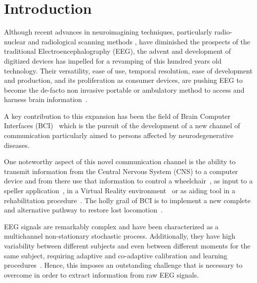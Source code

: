 \documentclass[utf8]{frontiersSCNS} %
\begin{document}
\section{Introduction}


Although recent advances in neuroimagining techniques, particularly radio-nuclear and radiological scanning methods \citep{Schomer2010}, have diminished the prospects of the traditional Electroencephalography (EEG), the advent and development of digitized devices has impelled for a revamping of this hundred years old technology.  Their versatility, ease of use, temporal resolution, ease of development and production, and its proliferation as consumer devices, are pushing EEG to become the de-facto non invasive portable or ambulatory method to access and harness brain information~\citep{DeVos2014}.

A key contribution to this expansion has been the field of Brain Computer Interfaces (BCI)~\citep{WolpawJonathanR2012} which is the pursuit of the development of a new channel of communication particularly aimed to persons affected by neurodegenerative diseases.

One noteworthy aspect of this novel communication channel is the ability to transmit information from the Central Nervous System (CNS) to a computer device and from there use that information to control a wheelchair~\citep{Carlson2013}, as input to a speller application~\citep{Guger2009a}, in a Virtual Reality environment~\citep{Lotte2013} or as aiding tool in a rehabilitation procedure~\citep{Jure2016}.  The holly grail of BCI is to implement a new complete and alternative pathway to restore lost locomotion~\citep{WolpawJonathanR2012}.

EEG signals are remarkably complex and have been characterized as a multichannel non-stationary stochastic process.  Additionally, they have high variability between different subjects and even between different moments for the same subject, requiring adaptive and co-adaptive calibration and learning procedures~\citep{Clerc}.  Hence, this imposes an outstanding challenge that is necessary to overcome in order to extract information from raw EEG signals.

\end{document}
